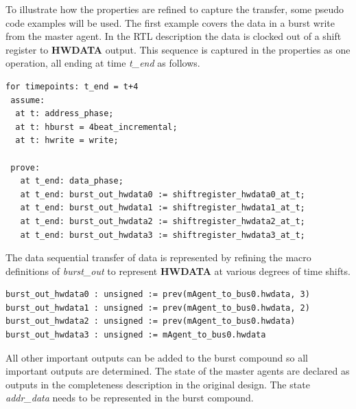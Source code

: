 To illustrate how the properties are refined to capture the transfer, some pseudo code examples will be used. The first example covers the data in a burst write from the master agent. In the RTL description the data is clocked out of a shift register to \textbf{HWDATA} output. This sequence is captured in the properties as one operation, all ending at time \textit{t\_end} as follows.
\begin{lstlisting}
for timepoints: t_end = t+4
 assume:
  at t: address_phase;
  at t: hburst = 4beat_incremental; 
  at t: hwrite = write;

 prove:
   at t_end: data_phase;
   at t_end: burst_out_hwdata0 := shiftregister_hwdata0_at_t; 
   at t_end: burst_out_hwdata1 := shiftregister_hwdata1_at_t; 
   at t_end: burst_out_hwdata2 := shiftregister_hwdata2_at_t;
   at t_end: burst_out_hwdata3 := shiftregister_hwdata3_at_t;
\end{lstlisting}

The data sequential transfer of data is represented by refining the macro definitions of \textit{burst\_out} to represent \textbf{HWDATA} at various degrees
of time shifts. 
 
\begin{lstlisting}
burst_out_hwdata0 : unsigned := prev(mAgent_to_bus0.hwdata, 3) 
burst_out_hwdata1 : unsigned := prev(mAgent_to_bus0.hwdata, 2) 
burst_out_hwdata2 : unsigned := prev(mAgent_to_bus0.hwdata)
burst_out_hwdata3 : unsigned := mAgent_to_bus0.hwdata 
\end{lstlisting}

All other important outputs can be added to the burst compound so all important outputs are determined. The state of the master agents are declared as outputs
in the completeness description in the original design. The state \textit{addr\_data} needs to be represented in the burst compound. 


